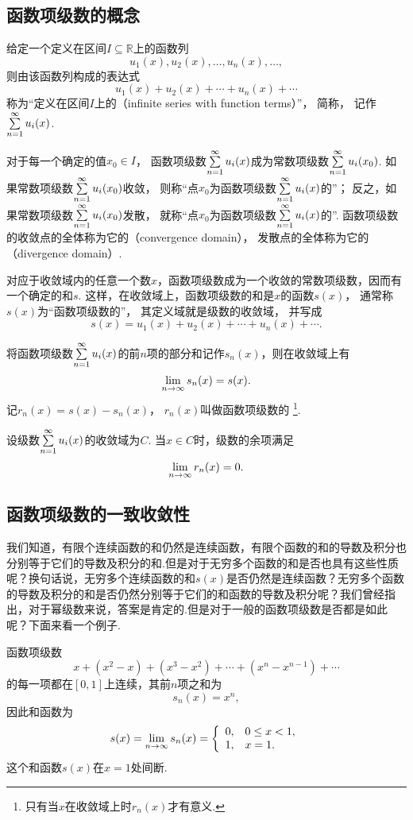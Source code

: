 \subsection{函数项级数的概念}
\begin{definition}\label{definition:无穷级数.实函数项级数的概念}
给定一个定义在区间\(I \subseteq \mathbb{R}\)上的函数列\[
u_1(x),u_2(x),\dotsc,u_n(x),\dotsc,
\]
则由该函数列构成的表达式\[
u_1(x)+u_2(x)+\dotsb+u_n(x)+\dotsb
\]
称为“定义在区间\(I\)上的（infinite series with function terms）”，%
简称，%
记作\(\sum\limits_{n=1}^\infty u_i(x)\).

对于每一个确定的值\(x_0 \in I\)，%
函数项级数\(\sum\limits_{n=1}^\infty u_i(x)\)成为常数项级数\(\sum\limits_{n=1}^\infty u_i(x_0)\).
如果常数项级数\(\sum\limits_{n=1}^\infty u_i(x_0)\)收敛，%
则称“点\(x_0\)为函数项级数\(\sum\limits_{n=1}^\infty u_i(x)\)的”；
反之，如果常数项级数\(\sum\limits_{n=1}^\infty u_i(x_0)\)发散，%
就称“点\(x_0\)为函数项级数\(\sum\limits_{n=1}^\infty u_i(x)\)的”.
函数项级数的收敛点的全体称为它的（convergence domain），%
发散点的全体称为它的（divergence domain）.

对应于收敛域内的任意一个数\(x\)，函数项级数成为一个收敛的常数项级数，因而有一个确定的和\(s\).
这样，在收敛域上，函数项级数的和是\(x\)的函数\(s(x)\)，%
通常称\(s(x)\)为“函数项级数的”，%
其定义域就是级数的收敛域，%
并写成\[
s(x) = u_1(x)+u_2(x)+\dotsb+u_n(x)+\dotsb.
\]

将函数项级数\(\sum\limits_{n=1}^\infty u_i(x)\)的前\(n\)项的部分和记作\(s_n(x)\)，则在收敛域上有\[
\lim\limits_{n\to\infty} s_n(x) = s(x).
\]
记\(r_n(x) = s(x)-s_n(x)\)，%
\(r_n(x)\)叫做函数项级数的%
\footnote{只有当\(x\)在收敛域上时\(r_n(x)\)才有意义.}.
\end{definition}

\begin{property}
设级数\(\sum\limits_{n=1}^\infty u_i(x)\)的收敛域为\(C\).
当\(x \in C\)时，级数的余项满足\[
\lim\limits_{n\to\infty} r_n(x) = 0.
\]
\end{property}

\subsection{函数项级数的一致收敛性}
我们知道，有限个连续函数的和仍然是连续函数，有限个函数的和的导数及积分也分别等于它们的导数及积分的和.但是对于无穷多个函数的和是否也具有这些性质呢？换句话说，无穷多个连续函数的和\(s(x)\)是否仍然是连续函数？无穷多个函数的导数及积分的和是否仍然分别等于它们的和函数的导数及积分呢？我们曾经指出，对于幂级数来说，答案是肯定的.但是对于一般的函数项级数是否都是如此呢？下面来看一个例子.
\begin{example}
函数项级数\[
x + (x^2-x) + (x^3-x^2) + \dotsb + (x^n-x^{n-1}) + \dotsb
\]的每一项都在\([0,1]\)上连续，其前\(n\)项之和为\[
s_n(x) = x^n,
\]因此和函数为\[
s(x) = \lim\limits_{n\to\infty} s_n(x)
= \left\{ \begin{array}{ll}
0, & 0 \leq x < 1, \\
1, & x = 1.
\end{array} \right.
\]
这个和函数\(s(x)\)在\(x=1\)处间断.
\end{example}

